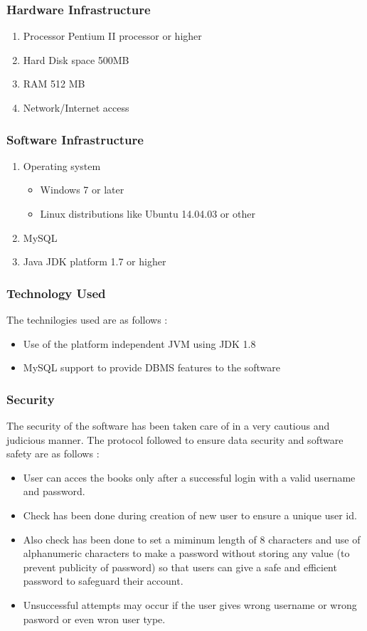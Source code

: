 \documentclass[a4paper]{article}
\begin{document}
\subsubsection{Hardware Infrastructure}
\begin {enumerate}
	\item Processor Pentium II processor or higher
	\item Hard Disk space 500MB
	\item RAM 512 MB
	\item Network/Internet access
\end{enumerate}
\subsubsection{Software Infrastructure}
\begin{enumerate}
	\item Operating system
		\begin{itemize}
		\item  Windows 7 or later
		\item Linux distributions like Ubuntu 14.04.03 or other
		\end{itemize}
	\item MySQL
	\item Java JDK platform 1.7 or higher
	\end{enumerate}
\subsubsection{Technology Used}
The technilogies used are as follows :
\begin{itemize}
\item Use of the platform independent JVM using JDK 1.8
\item MySQL support to provide DBMS features to the software
\end{itemize}
\subsubsection{Security}
The security of the software has been taken care of in a very cautious and judicious manner. The protocol followed to ensure data security and software safety are as follows :
\begin{itemize}
\item User can acces the books only after a successful login with a valid username and password.
\item Check has been done during creation of new user to ensure a unique user id.
\item Also check has been done to set a miminum length of 8 characters and use of alphanumeric characters to make a password without storing any value (to prevent publicity of password) so that users can give a safe and efficient password to safeguard their account. 
\item Unsuccessful attempts may occur if the user gives wrong username or wrong pasword or even wron user type.
\end{itemize}
\end{document}
